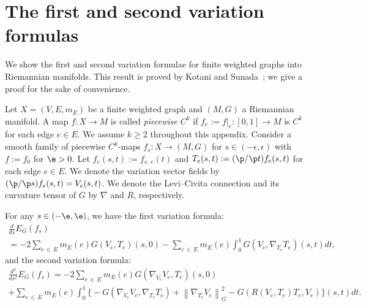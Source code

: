 \appendix

\section{The first and second variation formulas}

We show the first and second variation formulae for finite weighted graphs into Riemannian manifolds. This result is proved by Kotani and Sunada~\cite[Theorem~2.1]{KotaniSunadaStandard}; we give a proof for the sake of convenience.


Let $X=(V, E, m_E)$ be a finite weighted graph and $(M, G)$ a Riemannian manifold. A map $f: X\to M$ is called \emph{piecewise $C^k$} if $f_{e}:=f|_e: [0,1]\to M$ is $C^k$ for each edge $e\in E$. We assume $k\geq 2$ throughout this appendix. Consider a smooth family of piecewise $C^k$-maps $f_{s}: X \to (M, G)$ for $s\in (-\epsilon, \epsilon)$ with $f:=f_{0}$ for $\e>0$. Let $f_e(s, t):=f_{s,\,e} (t)$ and $T_e(s, t):=(\p/\p t)f_e(s, t)$ for each edge $e\in E$. We denote the variation vector fields by $(\p/\p s)f_e(s, t)=V_e(s, t)$. We denote the Levi--Civita connection and its curvature tensor of $G$ by $\nabla$ and $R$, respectively.


\begin{lemm}\label{Lem:first and second}
For any $s \in (-\e, \e)$, we have the first variation formula:
\begin{multline}\label{Eq:firstVF}
\frac{d}{d s} E_G(f_{s})\\
=-2\sum_{e\,\in\,E}m_E(e)G(V_e, T_e)(s,0)-\sum_{e\,\in\,E}m_E(e)\int_0^1 G\left(V_e, \nabla_{T_e}T_e\right)(s,t) dt,
\end{multline}
and the second variation formula:
\begin{multline}\label{Eq:secondVF}
\frac{d^2}{d s^2} E_G(f_{s})=-2\sum_{e\,\in\,E}m_E(e)G\left(\nabla_{V_e} V_e, T_e\right)(s,0)\\
+\sum_{e\,\in\,E}m_E(e) \int_0^1 \big\{-G\left(\nabla_{V_e}V_e, \nabla_{T_e}T_e\right)+\left\|\nabla_{T_e}V_e\right\|_G^2 -G\left(R\left(V_e, T_e\right)T_e, V_e\right) \big\}(s, t)dt.
\end{multline}
\end{lemm}

